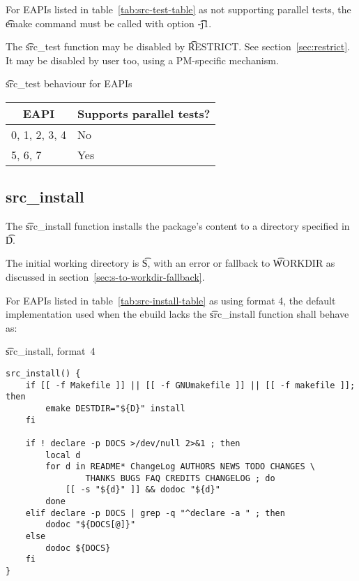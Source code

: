  For EAPIs listed in table~\ref{tab:src-test-table} as not supporting
parallel tests, the \t{emake} command must be called with option \t{-j1}.

The \t{src_test} function may be disabled by \t{RESTRICT}\@. See section~\ref{sec:restrict}. It may
be disabled by user too, using a PM-specific mechanism.

\begin{centertable}{\t{src_test} behaviour for EAPIs}
    \label{tab:src-test-table}
    \begin{tabular}{ll}
      \toprule
      \multicolumn{1}{c}{\textbf{EAPI}} &
      \multicolumn{1}{c}{\textbf{Supports parallel tests?}} \\
      \midrule
      0, 1, 2, 3, 4     & No  \\
      5, 6, 7           & Yes \\
      \bottomrule
    \end{tabular}
\end{centertable}

\subsection{src_install}

 The \t{src_install} function installs the package's content to a
directory specified in \t{D}.

The initial working directory is \t{S}, with an error or fallback to \t{WORKDIR} as discussed in
section~\ref{sec:s-to-workdir-fallback}.

 For EAPIs listed in table~\ref{tab:src-install-table} as using format
4, the default implementation used when the ebuild lacks the \t{src_install} function shall behave
as:

\begin{listing}[H]
\caption{\t{src_install}, format~4}
\begin{verbatim}
src_install() {
    if [[ -f Makefile ]] || [[ -f GNUmakefile ]] || [[ -f makefile ]]; then
        emake DESTDIR="${D}" install
    fi

    if ! declare -p DOCS >/dev/null 2>&1 ; then
        local d
        for d in README* ChangeLog AUTHORS NEWS TODO CHANGES \
                THANKS BUGS FAQ CREDITS CHANGELOG ; do
            [[ -s "${d}" ]] && dodoc "${d}"
        done
    elif declare -p DOCS | grep -q "^declare -a " ; then
        dodoc "${DOCS[@]}"
    else
        dodoc ${DOCS}
    fi
}
\end{verbatim}
\end{listing}

